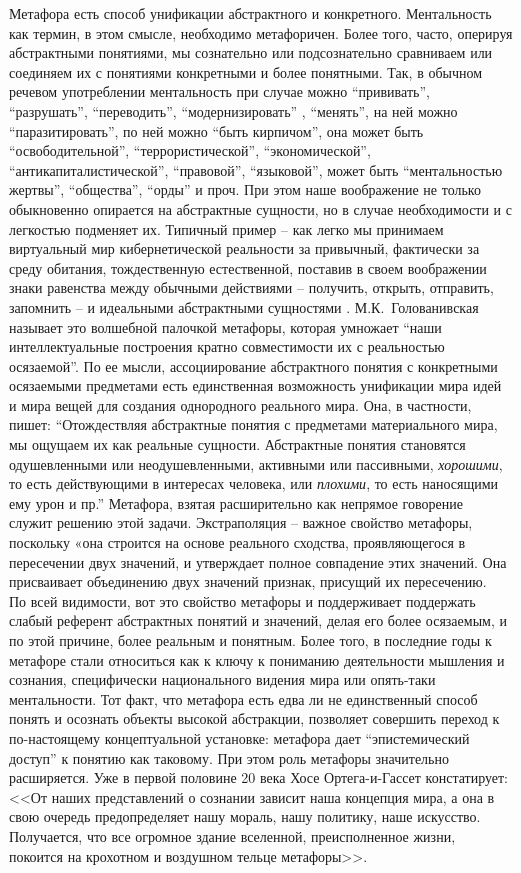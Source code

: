Метафора есть способ унификации абстрактного и конкретного. Ментальность как термин,
в этом смысле, необходимо метафоричен. Более того, часто, оперируя абстрактными понятиями,
мы сознательно или подсознательно сравниваем или соединяем их с понятиями конкретными и
более понятными. Так, в обычном речевом употреблении ментальность при случае можно ``прививать'',
``разрушать'', ``переводить'', ``модернизировать'' , ``менять'', на ней можно ``паразитировать'',
по ней можно ``быть кирпичом'', она может быть ``освободительной'',
``террористической'', ``экономической'', ``антикапиталистической'', ``правовой'', ``языковой'',
может быть ``ментальностью жертвы'', ``общества'', ``орды'' и проч. При этом наше
воображение не только обыкновенно опирается на абстрактные сущности, но в случае необходимости
и с легкостью подменяет их. Типичный пример -- как легко мы принимаем виртуальный
мир кибернетической реальности за привычный, фактически за среду обитания,
тождественную естественной, поставив в своем воображении знаки равенства между обычными действиями --
получить, открыть, отправить, запомнить -- и идеальными абстрактными сущностями
\autocite{ivanov_virtual}. М.К.~Голованивская называет это волшебной палочкой метафоры,
которая умножает ``наши интеллектуальные построения кратно совместимости их с реальностью осязаемой''.
По ее мысли, ассоциирование абстрактного понятия с конкретными осязаемыми предметами есть
единственная возможность унификации мира идей и мира вещей для создания однородного
реального мира. Она, в частности, пишет: ``Отождествляя абстрактные понятия с предметами материального мира,
мы ощущаем их как реальные сущности. Абстрактные понятия становятся одушевленными или неодушевленными,
активными или пассивными, \emph{хорошими}, то есть действующими в интересах человека, или
\emph{плохими}, то есть наносящими ему урон и пр.'' Метафора, взятая расширительно как непрямое
говорение~\autocite{lingvo_dictionary} служит решению этой задачи. Экстраполяция --
важное свойство метафоры, поскольку «она строится на основе реального сходства,
проявляющегося в пересечении двух значений, и утверждает полное совпадение этих значений.
Она присваивает объединению двух значений признак, присущий их пересечению.~\autocite{razlogova}
По всей видимости, вот это свойство метафоры и поддерживает поддержать слабый референт
абстрактных понятий и значений, делая его более осязаемым, и по этой причине, более
реальным и понятным. Более того, в последние годы к метафоре стали относиться как к ключу
к пониманию деятельности мышления и сознания, специфически национального видения мира или опять-таки
ментальности. Тот факт, что метафора есть едва ли не единственный способ понять и осознать
объекты высокой абстракции, позволяет совершить переход к по-настоящему концептуальной установке:
метафора дает ``эпистемический доступ'' к понятию как таковому\autocite{boyd}.
При этом роль метафоры значительно расширяется. Уже в первой половине 20 века
Хосе Ортега-и-Гассет констатирует: <<От наших представлений о сознании зависит наша
концепция мира, а она в свою очередь предопределяет нашу мораль, нашу политику,
наше искусство. Получается, что все огромное здание вселенной, преисполненное жизни,
покоится на крохотном и воздушном тельце метафоры>>\autocite{metaphors}.

